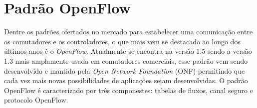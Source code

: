 \section{Padrão OpenFlow}
\label{sec:openflow}

Dentre os padrões ofertados no mercado para estabelecer uma comunicação entre os comutadores e os controladores, o que mais vem se destacado ao longo dos últimos anos é o \textit{OpenFlow}. Atualmente se encontra na versão 1.5 sendo a versão 1.3 mais amplamente usada em comutadores comerciais, esse padrão vem sendo desenvolvido e mantido pela \emph{Open Network Foundation} (ONF) permitindo que cada vez mais novas possibilidades de aplicações sejam desenvolvidas. O padrão OpenFlow é caracterizado por três componestes: tabelas de fluxos, canal seguro e protocolo OpenFlow.





